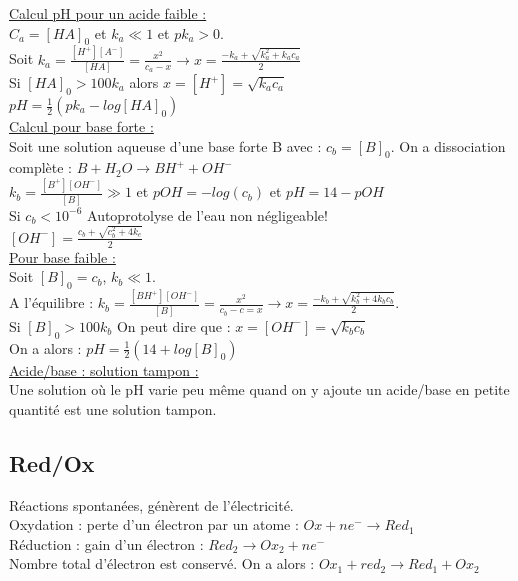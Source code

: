 \documentclass[../main.tex]{subfiles}
\begin{document}
\quad \underline{Calcul pH pour un acide faible :}\\
$C_a = [HA]_0$ et $k_a \ll 1$ et $pk_a > 0$.\\
Soit $k_a = \frac{[H^+] [A^-]}{[HA]} = \frac{x^2}{c_a-x} \rightarrow x =\frac{-k_a + \sqrt{k_a^2 + k_ac_a}}{2}$\\
Si $[HA]_0 > 100k_a$ alors $x = [H^+] = \sqrt{k_ac_a}$\\
$pH = \frac{1}{2} (pk_a - log[HA]_0)$\\

\quad \underline{Calcul pour base forte :}\\
Soit une solution aqueuse d'une base forte B avec : $c_b = [B]_0$. On a dissociation complète : $B+H_2O \rightarrow BH^+ +OH^-$\\
$k_b = \frac{[B^+] [OH^-]}{[B]} \gg 1$ et $pOH = -log(c_b)$ et $pH = 14-pOH$\\

\warning Si $c_b < 10^{-6}$ Autoprotolyse de l'eau non négligeable!\\
$[OH^-] = \frac{c_b + \sqrt{c_b^2 + 4k_e}}{2}$\\

\quad \underline{Pour base faible :}\\
Soit $[B]_0 = c_b$, $k_b \ll 1$.\\
A l'équilibre : $k_b = \frac{[BH^+][OH^-]}{[B]} = \frac{x^2}{c_b - c=x} \rightarrow x = \frac{-k_b + \sqrt{k_b^2 + 4k_b c_b}}{2}$.\\
Si $[B]_0 > 100k_b$ On peut dire que : $x = [OH^-] = \sqrt{k_b c_b}$\\
On a alors : $pH = \frac{1}{2} (14+log[B]_0)$\\

\quad \underline{Acide/base : solution tampon :}\\
Une solution où le pH varie peu même quand on y ajoute un acide/base en petite quantité est une solution tampon. \\

\subsection{Red/Ox}
Réactions spontanées, génèrent de l'électricité. \\
Oxydation : perte d'un électron par un atome : $Ox + ne^- \rightarrow Red_1$\\
Réduction : gain d'un électron : $Red_2 \rightarrow Ox_2 + ne^-$ \\
Nombre total d'électron est conservé. On a alors : $Ox_1 + red_2 \rightarrow Red_1 + Ox_2$\\
\end{document}
